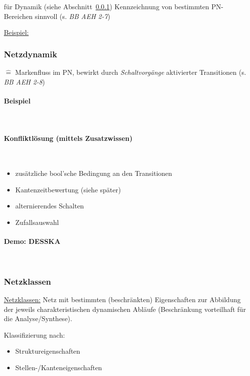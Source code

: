 \documentclass[12pt,a4paper]{scrartcl}
\numberwithin{equation}{section}
\newcommand{\properparagraph}[1]{\paragraph{#1}\mbox{}\\}
\begin{document}
für Dynamik (siehe Abschnitt~\ref{sec:netzdynamik}) Kennzeichnung von bestimmten PN-Bereichen sinnvoll (s. \textit{BB AEH 2-7})

\underline{Beispiel: }


\subsubsection{Netzdynamik} \label{sec:netzdynamik}
$\hat{=}$ Markenfluss im PN, bewirkt durch \textit{Schaltvorgänge} aktivierter Transitionen (s. \textit{BB AEH 2-8})

\properparagraph{Beispiel}

\properparagraph{Konfliktlösung (mittels Zusatzwissen)}
\begin{itemize}
	\item zusätzliche bool'sche Bedingung an den Transitionen
	\item Kantenzeitbewertung (siehe später)
	\item alternierendes Schalten
	\item Zufallsauswahl
\end{itemize}

\properparagraph{Demo: DESSKA}

\subsubsection{Netzklassen}
\underline{Netzklassen:} Netz mit bestimmten (beschränkten) Eigenschaften zur Abbildung der jeweils charakteristischen dynamischen Abläufe (Beschränkung vorteilhaft für die Analyse/Synthese).

Klassifizierung nach:
\begin{itemize}
	\item Struktureigenschaften
	\item Stellen-/Kanteneigenschaften 
\end{itemize}
\end{document}
